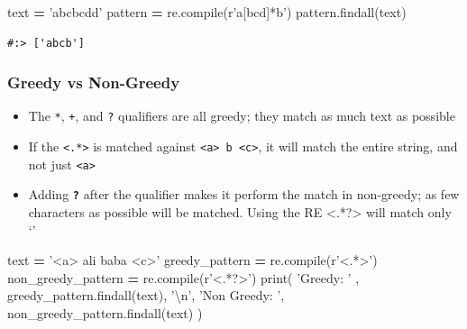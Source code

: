 \documentclass[
]{book}
\newenvironment{Shaded}{\begin{snugshade}}{\end{snugshade}}
\newcommand{\BuiltInTok}[1]{#1}
\newcommand{\CharTok}[1]{\textcolor[rgb]{0.5,0.5,0.5}{#1}}
\newcommand{\NormalTok}[1]{#1}
\newcommand{\OperatorTok}[1]{\textcolor[rgb]{0.43,0.43,0.43}{\textbf{#1}}}
\newcommand{\StringTok}[1]{\textcolor[rgb]{0.5,0.5,0.5}{#1}}
\newcommand{\VerbatimStringTok}[1]{\textcolor[rgb]{0.5,0.5,0.5}{#1}}
\providecommand{\tightlist}{%
  \setlength{\itemsep}{0pt}\setlength{\parskip}{0pt}}
\begin{document}
\begin{Shaded}
\begin{Highlighting}[]
\NormalTok{text }\OperatorTok{=} \StringTok{'abcbcdd'}
\NormalTok{pattern }\OperatorTok{=}\NormalTok{ re.}\BuiltInTok{compile}\NormalTok{(}\VerbatimStringTok{r'a[bcd]*b'}\NormalTok{)}
\NormalTok{pattern.findall(text)}
\end{Highlighting}
\end{Shaded}

\begin{verbatim}
#:> ['abcb']
\end{verbatim}

\hypertarget{greedy-vs-non-greedy}{%
\subsubsection{Greedy vs Non-Greedy}\label{greedy-vs-non-greedy}}

\begin{itemize}
\tightlist
\item
  The \texttt{*}, \texttt{+}, and \texttt{?} qualifiers are all greedy; they match as much text as possible\\
\item
  If the \texttt{\textless{}.*\textgreater{}} is matched against \texttt{\textless{}a\textgreater{}\ b\ \textless{}c\textgreater{}}, it will match the entire string, and not just \texttt{\textless{}a\textgreater{}}\\
\item
  Adding \textbf{\texttt{?}} after the qualifier makes it perform the match in non-greedy; as few characters as possible will be matched. Using the RE \textless.*?\textgreater{} will match only `'
\end{itemize}

\begin{Shaded}
\begin{Highlighting}[]
\NormalTok{text }\OperatorTok{=} \StringTok{'<a> ali baba <c>'}
\NormalTok{greedy_pattern     }\OperatorTok{=}\NormalTok{ re.}\BuiltInTok{compile}\NormalTok{(}\VerbatimStringTok{r'<.*>'}\NormalTok{)}
\NormalTok{non_greedy_pattern }\OperatorTok{=}\NormalTok{ re.}\BuiltInTok{compile}\NormalTok{(}\VerbatimStringTok{r'<.*?>'}\NormalTok{)}
\BuiltInTok{print}\NormalTok{( }\StringTok{'Greedy:      '}\NormalTok{ ,        greedy_pattern.findall(text), }\StringTok{'}\CharTok{\textbackslash{}n}\StringTok{'}\NormalTok{,}
       \StringTok{'Non Greedy: '}\NormalTok{, non_greedy_pattern.findall(text) )}
\end{Highlighting}
\end{Shaded}
\end{document}
